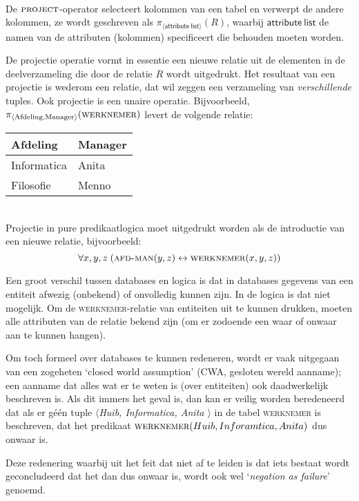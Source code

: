 \begin{aside}
\begin{definition}[Projectie]\mbox{}\\
De $\mathsf{\textsc{project}}$-operator selecteert kolommen van een tabel en verwerpt de andere kolommen, ze wordt geschreven als $\pi_{\langle\mathsf{attribute\ list}\rangle}(R)$, waarbij $\mathsf{attribute\ list}$ de namen van de attributen (kolommen) specificeert die behouden moeten worden.
\end{definition}
De projectie operatie vormt in essentie een nieuwe relatie uit de elementen in de deelverzameling die door de relatie $R$ wordt uitgedrukt. Het resultaat van een projectie is wederom een relatie, dat wil zeggen een verzameling van \textit{verschillende} tuples. Ook projectie is een unaire operatie. Bijvoorbeeld, $\pi_{\langle \text{Afdeling},\text{Manager}\rangle}(\textsc{werknemer})$ levert de volgende relatie:\\[2.5pt]
\begin{tabular}{|l|l|}
\hline
Afdeling & Manager\\
\hline
Informatica & Anita\\
Filosofie & Menno\\
\hline
\end{tabular}\\[2.5pt]
Projectie in pure predikaatlogica moet uitgedrukt worden als de introductie van een nieuwe relatie, bijvoorbeeld:
$$\forall x,y,z\; (\textsc{afd-man}(y,z) \leftrightarrow\textsc{werknemer}(x,y,z))$$

\begin{aside}\mbox{}
Een groot verschil tussen databases en logica is dat in databases gegevens van een entiteit afwezig (onbekend) of onvolledig kunnen zijn. In de logica is dat niet mogelijk. Om de \textsc{werknemer}-relatie van entiteiten uit te kunnen drukken, moeten alle attributen van de relatie bekend zijn (om er zodoende een waar of onwaar aan te kunnen hangen).

Om toch formeel over databases te kunnen redeneren, wordt er vaak uitgegaan van een zogeheten `closed world assumption' (CWA, gesloten wereld aanname); een aanname dat alles wat er te weten is (over entiteiten) ook daadwerkelijk beschreven is. Als dit immers het geval is, dan kan er veilig worden beredeneerd dat als er g\'e\'en tuple \textit{$\langle$Huib, Informatica, Anita $\rangle$} in de tabel \textsc{werknemer} is beschreven, dat het predikaat $\textsc{werknemer}(Huib, Inforamtica, Anita)$ dus onwaar is. 

Deze redenering waarbij uit het feit dat niet af te leiden is dat iets bestaat wordt geconcludeerd dat het dan dus onwaar is, wordt ook wel `\textit{negation as failure}' genoemd.
\end{aside}


\end{aside}
